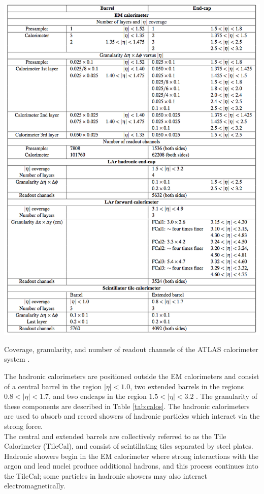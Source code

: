 \begin{table}
\includegraphics[width=5.5in]{figures/chapter2/calo_gran.png}
    \caption{Coverage, granularity, and number of readout channels of the ATLAS calorimeter system \cite{atlas}.}
    \label{tab:calos}
\end{table}

The hadronic calorimeters are positioned outside the EM calorimeters and consist of a central barrel in the region $|\eta|<1.0$, two extended barrels in the regions $0.8<|\eta|<1.7$, and two endcaps in the region $1.5<|\eta|<3.2$ \cite{atlas}. The granularity of these components are described in Table \ref{tab:calos}. The hadronic calorimeters are used to absorb and record showers of hadronic particles which interact via the strong force.\\

The central and extended barrels are collectively referred to as the Tile Calorimeter (TileCal), and consist of scintillating tiles separated by steel plates. Hadronic showers begin in the EM calorimeter where strong interactions with the argon and lead nuclei produce additional hadrons, and this process continues into the TileCal; some particles in hadronic showers may also interact electromagnetically.\\

